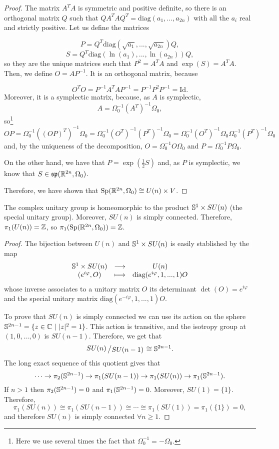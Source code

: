 \begin{proof}
The matrix $A^TA$ is symmetric and positive definite, so there is an orthogonal matrix $Q$ such that $QA^TAQ^T = \text{diag}(a_1,...,a_{2n})$ with all the $a_i$ real and strictly positive. Let us define the matrices

\[P = Q^T\text{diag}(\sqrt{a_1},...,\sqrt{a_{2n}}) Q, \]
\[S = Q^T\text{diag}(\ln(a_1),...,\ln(a_{2n})) Q ,\]
so they are the unique matrices such that $P^2 = A^TA$ and $\exp(S) = A^TA$. Then, we define $O = AP^{-1}$. It is an orthogonal matrix, because

\[O^TO = P^{-1}A^TAP^{-1} = P^{-1} P^2 P^{-1} = \text{Id} .\]
Moreover, it is a symplectic matrix, because, as $A$ is symplectic,
\[A = \Omega_0^{-1} (A^T)^{-1} \Omega_0,\]
so\footnote{Here we use several times the fact that $\Omega_0^{-1} = -\Omega_0$.}
\[OP = \Omega_0^{-1}((OP)^T)^{-1} \Omega_0 = \Omega_0^{-1} (O^T)^{-1} (P^T)^{-1} \Omega_0 = \Omega_0^{-1} (O^T)^{-1} \Omega_0 \Omega_0^{-1} (P^T)^{-1} \Omega_0\]
and, by the uniqueness of the decomposition, $O = \Omega_0^{-1} O \Omega_0$ and $P = \Omega_0^{-1} P \Omega_0$.

On the other hand, we have that $P = \exp(\frac12 S)$ and, as $P$ is symplectic, we know that $S \in \mathfrak{sp}(\mathbb{R}^{2n},\Omega_0)$.

Therefore, we have shown that $\mathrm{Sp}(\mathbb{R}^{2n}, \Omega_0) \cong U(n) \times V$.
\end{proof}

\begin{prop}
The complex unitary group is homeomorphic to the product $\mathbb{S}^1 \times SU(n)$ (the special unitary group). Moreover, $SU(n)$ is simply connected. Therefore, $\pi_1(U(n)) = \mathbb{Z}$, so $\pi_1(\mathrm{Sp}(\mathbb{R}^{2n},\Omega_0)) = \mathbb{Z}$.
\end{prop}

\begin{proof}
The bijection between $U(n)$ and $\mathbb{S}^1 \times SU(n)$ is easily stablished by the map
\[\begin{array}{ccc} \mathbb{S}^1 \times SU(n) & \longrightarrow & U(n) \\ (e^{i \varphi}, O) & \longmapsto & \text{diag}(e^{i \varphi},1,...,1) O \end{array}\]
whose inverse associates to a unitary matrix $O$ its determinant $\det(O) = e^{i \varphi}$ and the special unitary matrix $\text{diag}(e^{-i \varphi},1,...,1) O$.

To prove that $SU(n)$ is simply connected we can use its action on the sphere $\mathbb{S}^{2n-1} = \{z \in \mathbb{C} \ | \ |z|^2 = 1\}$. This action is transitive, and the isotropy group at $(1,0,...,0)$ is $SU(n-1)$. Therefore, we get that
\[\quocient{SU(n)}{SU(n-1)} \cong \con{S}^{2n-1} .\]
The long exact sequence of this quotient gives that
\[\cdots \rightarrow \pi_2(\mathbb{S}^{2n-1}) \rightarrow \pi_1(SU(n-1)) \rightarrow \pi_1(SU(n)) \rightarrow \pi_1(\mathbb{S}^{2n-1}) .\]
If $n > 1$ then $\pi_2(\mathbb{S}^{2n-1}) = 0$ and $\pi_1(\mathbb{S}^{2n-1})=0$. Moreover, $SU(1)=\{1\}$. Therefore,
\[\pi_1(SU(n)) \cong \pi_1(SU(n-1)) \cong \cdots \cong \pi_1(SU(1)) = \pi_1(\{1\}) = 0,\]
and therefore $SU(n)$ is simply connected $\forall n \geq 1$.
\end{proof}

